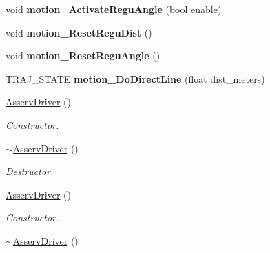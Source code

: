 \begin{DoxyCompactItemize}
\item 
\mbox{\label{classAsservDriver_a846608b8033f7d592d2540b68de72eeb}} 
void {\bfseries motion\+\_\+\+Activate\+Regu\+Angle} (bool enable)
\item 
\mbox{\label{classAsservDriver_acb84d282c7e0b40d9b326b0fcb7a0c69}} 
void {\bfseries motion\+\_\+\+Reset\+Regu\+Dist} ()
\item 
\mbox{\label{classAsservDriver_acd102376cacdf0fc40a587f25359a25e}} 
void {\bfseries motion\+\_\+\+Reset\+Regu\+Angle} ()
\item 
\mbox{\label{classAsservDriver_a27f3a8fa56cc689d072a39efb1ed20b3}} 
T\+R\+A\+J\+\_\+\+S\+T\+A\+TE {\bfseries motion\+\_\+\+Do\+Direct\+Line} (float dist\+\_\+meters)
\item 
\mbox{\label{classAsservDriver_a70982198e21af96e5d4faa6ce9b0608c}} 
\hyperlink{classAsservDriver_a70982198e21af96e5d4faa6ce9b0608c}{Asserv\+Driver} ()
\begin{DoxyCompactList}\small\item\em Constructor. \end{DoxyCompactList}\item 
\mbox{\label{classAsservDriver_a5960b3ced1e727d33ded6ff469fc1a78}} 
\hyperlink{classAsservDriver_a5960b3ced1e727d33ded6ff469fc1a78}{$\sim$\+Asserv\+Driver} ()
\begin{DoxyCompactList}\small\item\em Destructor. \end{DoxyCompactList}\item 
\mbox{\label{classAsservDriver_a70982198e21af96e5d4faa6ce9b0608c}} 
\hyperlink{classAsservDriver_a70982198e21af96e5d4faa6ce9b0608c}{Asserv\+Driver} ()
\begin{DoxyCompactList}\small\item\em Constructor. \end{DoxyCompactList}\item 
\mbox{\label{classAsservDriver_a5960b3ced1e727d33ded6ff469fc1a78}} 
\hyperlink{classAsservDriver_a5960b3ced1e727d33ded6ff469fc1a78}{$\sim$\+Asserv\+Driver} ()

\end{DoxyCompactItemize}
